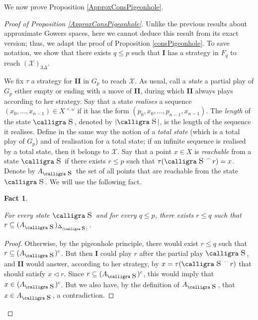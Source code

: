 \documentclass[a4paper,11pt]{article}
\newtheorem{fact}[thm]{Fact}
\theoremstyle{definition}
\numberwithin{equation}{section}
\newcommand{\X}{\mathcal{X}}
\newcommand{\I}{\textbf{I}}
\newcommand{\II}{\textbf{II}}
\newcommand{\st}{\text{{\calligra \LARGE s}}\,}
\newcommand{\stp}{\text{{\calligra \large s}}\,}
\newcommand{\Ast}{A_{\text{{\calligra \Large s}}\,}}
\newcommand{\concat}{%
  \mathbin{\raisebox{1ex}{\scalebox{.7}{$\frown$}}}%
}
\begin{document}
We now prove Proposition \ref{ApproxConsPigeonhole}.

\begin{proof}[Proof of Proposition \ref{ApproxConsPigeonhole}]

Unlike the previous results about approximate Gowers spaces, here we cannot deduce this result from its exact version; thus, we adapt the proof of Proposition \ref{consPigeonhole}. To save notation, we show that there exists $q \leqslant p$ such that \I{} has a strategy in $F_q$ to reach $(\X)_{3\Delta}$.

\smallskip

We fix $\tau$ a strategy for \II{} in $G_p$ to reach $\X$. As usual, call a \emph{state} a partial play of $G_p$ either empty or ending with a move of \II{}, during which \II{} always plays according to her strategy. Say that a state \emph{realises} a sequence $(x_0, \ldots, x_{n - 1}) \in X^{< \omega}$ if it has the form $(p_0, x_0, \ldots, p_{n - 1}, x_{n - 1})$. The \emph{length} of the state $\st$, denoted by $|\st|$, is the length of the sequence it realises. Define in the same way the notion of a \emph{total state} (which is a total play of $G_p$) and of realisation for a total state; if an infinite sequence is realised by a total state, then it belongs to $\X$. Say that a point $x \in X$ is \emph{reachable} from a state $\st$ if there exists $r \leqslant p$ such that $\tau(\st \concat r) = x$. Denote by $\Ast$ the set of all points that are reachable from the state \nolinebreak $\st$. We will use the following fact.

\begin{fact}\label{factdeuxonzebis}

For every state $\st$ and for every $q \leqslant p$, there exists $r \leqslant q$ such that $r \subseteq (\Ast)_{\Delta_{|\stp|}}$.

\end{fact}

\begin{proof}

Otherwise, by the pigeonhole principle, there would exist $r \leqslant q$ such that $r \subseteq (\Ast)^c$. But then \I{} could play $r$ after the partial play $\st$, and \II{} would answer, according to her strategy, by $x = \tau(\st \concat r)$ that should satisfy $x \vartriangleleft r$. Since $r \subseteq (\Ast)^c$, this would imply that $x \in (\Ast)^c$. But we also have, by the definition of $\Ast$, that $x \in \Ast$, a contradiction.

\end{proof}


\end{proof}
\end{document}
